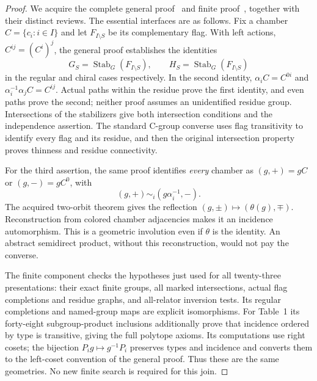\documentclass[11pt,a4paper]{article}
\begin{document}
\begin{proof}
We acquire the complete general proof~\cite{general} and finite
proof~\cite{finite}, together with their distinct reviews. The essential
interfaces are as follows. Fix a chamber $C=\{c_i:i\in I\}$ and let
$F_{I\setminus S}$ be its complementary flag. With left actions,
$C^{ij}=(C^i)^j$, the general proof establishes the identities
\[
 G_S=\operatorname{Stab}_G(F_{I\setminus S}),\qquad
 H_S=\operatorname{Stab}_G(F_{I\setminus S})
\]
in the regular and chiral cases respectively. In the second identity,
$\alpha_iC=C^{0i}$ and
$\alpha_i^{-1}\alpha_jC=C^{ij}$. Actual paths within the residue prove
the first identity, and even paths prove the second; neither proof assumes
an unidentified residue group. Intersections of the stabilizers give both
intersection conditions and the independence assertion. The standard
C-group converse uses flag transitivity to identify every flag and its
residue, and then the original intersection property proves thinness and
residue connectivity.

For the third assertion, the same proof identifies \emph{every} chamber
as $(g,+)=gC$ or $(g,-)=gC^0$, with
\[
                (g,+)\sim_i(g\alpha_i^{-1},-).
\]
The acquired two-orbit theorem gives the reflection
$(g,\pm)\mapsto(\theta(g),\mp)$. Reconstruction from colored chamber
adjacencies makes it an incidence automorphism. This is a geometric
involution even if $\theta$ is the identity. An abstract semidirect
product, without this reconstruction, would not pay the converse.

The finite component checks the hypotheses just used for all twenty-three
presentations: their exact finite groups, all marked intersections, actual
flag completions and residue graphs, and all-relator inversion tests.
Its regular completions and named-group maps are explicit isomorphisms.
For Table~1 its forty-eight subgroup-product inclusions additionally prove
that incidence ordered by type is transitive, giving the full polytope
axioms. Its computations use right cosets; the bijection
$P_i g\mapsto g^{-1}P_i$ preserves types and incidence and converts them
to the left-coset convention of the general proof. Thus these are the same
geometries. No new finite search is required for this join.
\end{proof}
\end{document}
